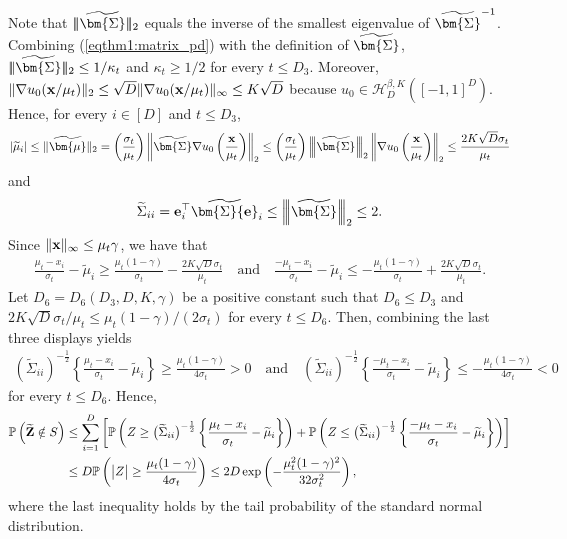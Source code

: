 \documentclass[11pt,a4paper,final]{article}
\numberwithin{equation}{section}
\theoremstyle{remark}
\def\cH{\mathcal H}
\newcommand{\bfe}{{\bf e}}
\newcommand{\bx}{{\bf x}}
\newcommand{\bZ}{{\bf Z}}
\newcommand{\bbP}{{\mathbb P}}
\newcommand{\bSigma}{\bm{\Sigma}}
\newcommand{\bmu}{\bm{\mu}}
\newcommand{\be}{\begin{equation}}
\newcommand{\ee}{\end{equation}}
\newcommand{\bean}{\setlength\arraycolsep{1pt}\begin{eqnarray*}}
\newcommand{\eean}{\end{eqnarray*}}
\newcommand{\tnorm}[1]{\vert\mkern-3mu\vert\mkern-3mu\vert #1 \vert\mkern-3mu\vert\mkern-3mu\vert}
\newcommand{\Tnorm}[1]{\left\vert\mkern-3mu\left\vert\mkern-3mu\left\vert #1 \right\vert\mkern-3mu\right\vert\mkern-3mu\right\vert}
\begin{document}
Note that $\tnorm{ \widetilde \bSigma }_2$ equals the inverse of the smallest eigenvalue of $\widetilde \bSigma^{-1}$.
Combining  (\ref{eqthm1:matrix_pd}) with the definition of $\widetilde \bSigma$,
$\tnorm{ \widetilde \bSigma}_2 \leq 1/ \kappa_{t}$ and $ \kappa_{t} \geq 1/2 $ for every $t \leq D_{3}$.
Moreover, $\| \nabla u_0 (\bx / \mu_t) \|_2 \leq \sqrt{D} \| \nabla u_0 (\bx / \mu_t ) \|_{\infty} \leq K \sqrt{D} $ because $u_0 \in \cH^{\beta,K}_{D}([-1,1]^{D})$.
Hence, for every $i \in [D]$ and $t \leq D_{3}$,
\bean
\vert \widetilde \mu_i \vert \leq \| \widetilde \bmu \|_2
= \left( \frac{\sigma_{t}}{\mu_t} \right)
\left\| \widetilde \bSigma \nabla u_0 \left( \frac{\bx}{\mu_{t}} \right)  \right\|_{2}
\leq 
\left( \frac{\sigma_{t}}{\mu_t} \right)
\Tnorm{\widetilde \bSigma}_{2}
\left\| \nabla u_0 \left( \frac{\bx}{\mu_{t}} \right) \right\|_{2}
 \leq  \frac{ 2  K \sqrt{ D }  \sigma_{t}  }{\mu_t} 
\eean
and
\bean
\widetilde \Sigma_{ii} = \bfe_{i}^{\top} \widetilde \bSigma \bfe_{i}
\leq \Tnorm{\widetilde \bSigma}_{2} \leq 2.
\eean
Since $\| \bx \|_{\infty} \leq \mu_t \gamma $, we have that
\bean
 \frac{\mu_{t} - x_i}{\sigma_{t} } - \widetilde \mu_i 
\geq \frac{\mu_t ( 1-\gamma) }{\sigma_{t}} - \frac{2 K \sqrt{ D }  \sigma_t}{\mu_t}
\quad \text{and} \quad
 \frac{-\mu_{t} - x_i}{\sigma_{t} } - \widetilde \mu_i 
\leq - \frac{\mu_t (1-\gamma) }{\sigma_{t}} + \frac{2 K \sqrt{ D }  \sigma_t}{\mu_t}.
\eean
Let $D_{6} = D_{6} ( D_{3}, D, K, \gamma ) $ be a positive constant such that $D_{6} \leq D_{3}$ and $ 2 K \sqrt{ D } \sigma_{t} / \mu_t \leq \mu_{t} (1-\gamma) / (2 \sigma_{t}) $ for every $t \leq D_{6}$.
Then, combining the last three displays yields
\bean
 \left( \widetilde \Sigma_{ii} \right)^{-\frac{1}{2}} \left\{ \frac{\mu_{t} - x_i}{ \sigma_{t} } - \widetilde \mu_i \right\}
\geq \frac{\mu_{t} ( 1- \gamma) }{ 4 \sigma_{t}} > 0
\quad \text{and} \quad
 \left( \widetilde \Sigma_{ii} \right)^{-\frac{1}{2}} \left\{ \frac{-\mu_{t} - x_i}{\sigma_{t} } - \widetilde \mu_i \right\} 
\leq  -\frac{\mu_{t} ( 1 - \gamma) }{ 4 \sigma_{t}} < 0
\eean
for every $t \leq D_{6}$.
Hence,
\be
\begin{split}
\bbP \left( \widetilde \bZ \notin S \right) 
& \leq \sum_{i=1}^{D} \left[  \bbP \left( Z \geq \big( \widetilde \Sigma_{ii} \big)^{-\frac{1}{2}} \left\{ \frac{\mu_{t} - x_i}{\sigma_{t} } - \widetilde \mu_i \right\} \right) 
+ \bbP \left( Z \leq \big( \widetilde \Sigma_{ii} \big)^{-\frac{1}{2}} \left\{ \frac{- \mu_{t} - x_i}{\sigma_{t} } - \widetilde \mu_i \right\} \right) 
\right]
\\
& \leq D \bbP \left( \big\vert  Z  \big\vert \geq \frac{\mu_{t} (1-\gamma) }{ 4 \sigma_{t} } \right)
\leq 2 D \exp \left( -\frac{\mu_{t}^2 (1-\gamma)^2 }{32 \sigma_{t}^2} \right),
\label{eqthm1:tail_bd}
\end{split}
\ee
where the last inequality holds by the tail probability of the standard normal distribution.
\end{document}
